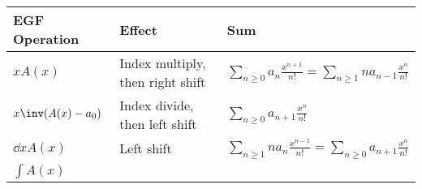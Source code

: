 \begin{longtable}[]{@{}lll@{}}
\toprule
\begin{minipage}[b]{0.30\columnwidth}\raggedright
EGF Operation\strut
\end{minipage} & \begin{minipage}[b]{0.30\columnwidth}\raggedright
Effect\strut
\end{minipage} & \begin{minipage}[b]{0.30\columnwidth}\raggedright
Sum\strut
\end{minipage}\tabularnewline
\midrule
\endhead
\begin{minipage}[t]{0.30\columnwidth}\raggedright
\(xA(x)\)\strut
\end{minipage} & \begin{minipage}[t]{0.30\columnwidth}\raggedright
Index multiply, then right shift\strut
\end{minipage} & \begin{minipage}[t]{0.30\columnwidth}\raggedright
\(\displaystyle\sum_{n\geq 0}a_{n} \frac{x^{n+1}}{n!} = \displaystyle\sum_{n\geq 1}n a_{n-1} \frac{x^n}{n!}\)\strut
\end{minipage}\tabularnewline
\begin{minipage}[t]{0.30\columnwidth}\raggedright
\(x\inv (A(x) - a_0)\)\strut
\end{minipage} & \begin{minipage}[t]{0.30\columnwidth}\raggedright
Index divide, then left shift\strut
\end{minipage} & \begin{minipage}[t]{0.30\columnwidth}\raggedright
\(\displaystyle\sum_{n\geq 0}a_{n+1} \frac{x^n}{n!}\)\strut
\end{minipage}\tabularnewline
\begin{minipage}[t]{0.30\columnwidth}\raggedright
\(\dd{}{x}A(x)\)\strut
\end{minipage} & \begin{minipage}[t]{0.30\columnwidth}\raggedright
Left shift\strut
\end{minipage} & \begin{minipage}[t]{0.30\columnwidth}\raggedright
\(\displaystyle\sum_{n\geq 1}n a_n \frac{x^{n-1}}{n!} = \displaystyle\sum_{n\geq 0}a_{n+1} \frac{x^n}{n!}\)\strut
\end{minipage}\tabularnewline
\begin{minipage}[t]{0.30\columnwidth}\raggedright
\(\displaystyle\int A(x)\)\strut
\end{minipage} & \begin{minipage}[t]{0.30\columnwidth}\raggedright

\end{minipage}
\end{longtable}
